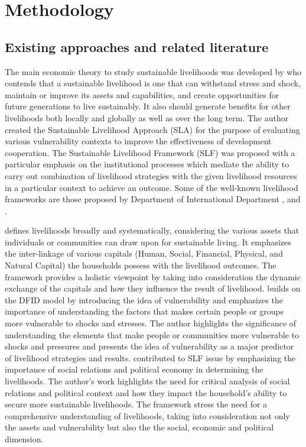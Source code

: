 \section{Methodology} \label{isect2}
\subsection{Existing approaches and related literature}
The main economic theory to study sustainable livelihoods was developed by \cite{chambers1992sustainable} who contends that a sustainable livelihood is one that can withstand stress and shock, maintain or improve its assets and capabilities, and create opportunities for future generations to live sustainably. It also should generate benefits for other livelihoods both locally and globally as well as over the long term. The author created the Sustainable Livelihood Approach (SLA) for the purpose of evaluating various vulnerability contexts to improve the effectiveness of development cooperation. The Sustainable Livelihood Framework (SLF) was proposed with a particular emphasis on the institutional processes which mediate the ability to carry out combination of livelihood strategies with the given livelihood resources in a particular context to achieve an outcome. Some of the well-known livelihood frameworks are those proposed by Department of International Department \cite{dfid1999sustainable}, \cite{ellis1999rural} and \cite{scoones2013livelihoods}.\par

\cite{dfid1999sustainable} defines livelihoods broadly and systematically, considering the various assets that individuals or communities can draw upon for sustainable living. It emphasizes the inter-linkage of various capitals (Human, Social, Financial, Physical, and Natural Capital) the households possess with the livelihood outcomes. The framework provides a holistic viewpoint by taking into consideration the dynamic exchange of the capitals and how they influence the result of livelihood. \cite{ellis1999rural}  builds on the DFID model by introducing the idea of vulnerability and emphasizes the importance of understanding the factors that makes certain people or groups more vulnerable to shocks and stresses. The author highlights the significance of understanding the elements that make people or communities more vulnerable to shocks and pressures and presents the idea of vulnerability as a major predictor of livelihood strategies and results. \cite{scoones2013livelihoods} contributed to SLF issue by emphasizing the importance of social relations and political economy in determining the livelihoods. The author's work highlights the need for critical analysis of social relations and political context and how they impact the household's ability to secure more sustainable livelihoods. The framework stress the need for a comprehensive understanding of livelihoods, taking into consideration not only the assets and vulnerability but also the the social, economic and political dimension.\par

